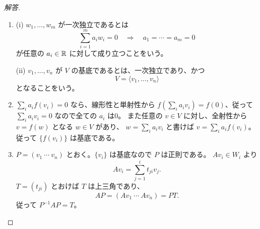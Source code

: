 \begin{proof}[解答]
\begin{enumerate}
  \item[(1)] (i) $w_1,\ldots,w_m$ が一次独立であるとは
  \[
  \sum_{i=1}^m a_iw_i=0\quad\Longrightarrow\quad a_1=\cdots=a_m=0
  \]
  が任意の $a_i\in\mathbb{R}$ に対して成り立つことをいう。

  (ii) $v_1,\ldots,v_n$ が $V$ の基底であるとは、一次独立であり、かつ
  \[
  V=\langle v_1,\ldots,v_n\rangle
  \]
  となることをいう。

  \item[(2)] $\sum_i a_if(v_i)=0$ なら、線形性と単射性から
  $f(\sum_i a_iv_i)=f(0)$、従って $\sum_i a_iv_i=0$ なので全ての $a_i$ は0。
  また任意の $v\in V$ に対し、全射性から $v=f(w)$ となる $w\in V$ があり、
  $w=\sum_i a_iv_i$ と書けば $v=\sum_i a_if(v_i)$。従って $\{f(v_i)\}$ は基底である。

  \item[(3)] $P=(v_1\ \cdots\ v_n)$ とおく。$\{v_i\}$ は基底なので $P$ は正則である。
  $Av_i\in W_i$ より
  \[
  Av_i=\sum_{j=1}^i t_{ji}v_j.
  \]
  $T=(t_{ji})$ とおけば $T$ は上三角であり、
  \[
  AP=(Av_1\ \cdots\ Av_n)=PT.
  \]
  従って $P^{-1}AP=T$。
\end{enumerate}
\end{proof}

